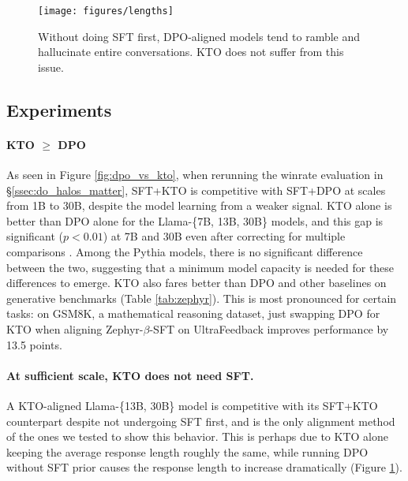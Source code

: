 \begin{figure}[t]
    \centering
    \texttt{[image: figures/lengths]}
    \vspace{-15pt}
    \caption{Without doing SFT first, DPO-aligned models tend to ramble and hallucinate entire conversations.
    KTO does not suffer from this issue.
    }
    \label{fig:lengths}
\end{figure}

\subsection{Experiments}
\label{ssec:experiments}

\paragraph{KTO $\geq$ DPO} As seen in Figure \ref{fig:dpo_vs_kto}, when rerunning the winrate evaluation in \S\ref{ssec:do_halos_matter}, SFT+KTO is competitive with SFT+DPO at scales from 1B to 30B, despite the model learning from a weaker signal.
KTO alone is better than DPO alone for the Llama-\{7B, 13B, 30B\} models, and this gap is significant ($p < 0.01$) at 7B and 30B even after correcting for multiple comparisons \citep{holm1979simple}.
Among the Pythia models, there is no significant difference between the two, suggesting that a minimum model capacity is needed for these differences to emerge.
KTO also fares better than DPO and other baselines on generative benchmarks (Table \ref{tab:zephyr}).
This is most pronounced for certain tasks: on GSM8K, a mathematical reasoning dataset, just swapping DPO for KTO when aligning Zephyr-$\beta$-SFT \cite{tunstall2023zephyr} on UltraFeedback \citep{cui2023ultrafeedback} improves performance by 13.5 points.

\paragraph{At sufficient scale, KTO does not need SFT.}
A KTO-aligned Llama-\{13B, 30B\} model is competitive with its SFT+KTO counterpart despite not undergoing SFT first, and is the only alignment method of the ones we tested to show this behavior.
This is perhaps due to KTO alone keeping the average response length roughly the same, while running DPO without SFT  prior causes the response length to increase dramatically (Figure \ref{fig:lengths}).

